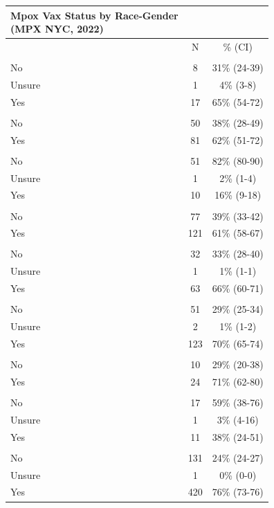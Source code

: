 \documentclass[
  letterpaper,
  DIV=11,
  numbers=noendperiod,
  oneside]{scrreprt}
\begin{document}
\begin{longtable*}{lcc}
\caption*{
{\large Mpox Vax Status by Race-Gender} \\ 
{\small (MPX NYC, 2022)}
} \\ 
\toprule
 & N & \% (CI) \\ 
\midrule\addlinespace[2.5pt]
 \\ 
\midrule\addlinespace[2.5pt]
No & 8 & 31\% (24-39) \\ 
Unsure & 1 & 4\% (3-8) \\ 
Yes & 17 & 65\% (54-72) \\ 
\midrule\addlinespace[2.5pt]
 \\ 
\midrule\addlinespace[2.5pt]
No & 50 & 38\% (28-49) \\ 
Yes & 81 & 62\% (51-72) \\ 
\midrule\addlinespace[2.5pt]
 \\ 
\midrule\addlinespace[2.5pt]
No & 51 & 82\% (80-90) \\ 
Unsure & 1 & 2\% (1-4) \\ 
Yes & 10 & 16\% (9-18) \\ 
\midrule\addlinespace[2.5pt]
 \\ 
\midrule\addlinespace[2.5pt]
No & 77 & 39\% (33-42) \\ 
Yes & 121 & 61\% (58-67) \\ 
\midrule\addlinespace[2.5pt]
 \\ 
\midrule\addlinespace[2.5pt]
No & 32 & 33\% (28-40) \\ 
Unsure & 1 & 1\% (1-1) \\ 
Yes & 63 & 66\% (60-71) \\ 
\midrule\addlinespace[2.5pt]
 \\ 
\midrule\addlinespace[2.5pt]
No & 51 & 29\% (25-34) \\ 
Unsure & 2 & 1\% (1-2) \\ 
Yes & 123 & 70\% (65-74) \\ 
\midrule\addlinespace[2.5pt]
 \\ 
\midrule\addlinespace[2.5pt]
No & 10 & 29\% (20-38) \\ 
Yes & 24 & 71\% (62-80) \\ 
\midrule\addlinespace[2.5pt]
 \\ 
\midrule\addlinespace[2.5pt]
No & 17 & 59\% (38-76) \\ 
Unsure & 1 & 3\% (4-16) \\ 
Yes & 11 & 38\% (24-51) \\ 
\midrule\addlinespace[2.5pt]
 \\ 
\midrule\addlinespace[2.5pt]
No & 131 & 24\% (24-27) \\ 
Unsure & 1 & 0\% (0-0) \\ 
Yes & 420 & 76\% (73-76) \\ 
\bottomrule
\end{longtable*}
\end{document}
